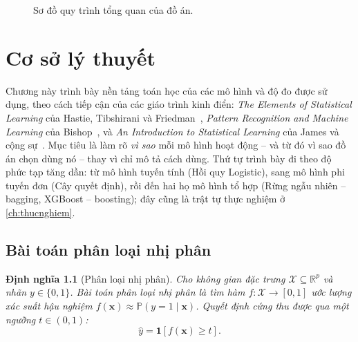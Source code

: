 \documentclass[12pt,a4paper,oneside]{report}
\theoremstyle{vnplain}
\theoremstyle{vndef}
\newtheorem{dinhnghia}[dlytheo]{Định nghĩa}
\newcommand{\R}{\mathbb{R}}
\newcommand{\Prob}{\mathbb{P}}
\newcommand{\xv}{\mathbf{x}}
\begin{document}
\begin{figure}[H]\centering
{}
\caption{Sơ đồ quy trình tổng quan của đồ án.}
\label{fig:pipeline}
\end{figure}

\chapter{Cơ sở lý thuyết}\label{ch:lythuyet}

Chương này trình bày nền tảng toán học của các mô hình và độ đo được sử dụng, theo cách
tiếp cận của các giáo trình kinh điển: \emph{The Elements of Statistical Learning} của
Hastie, Tibshirani và Friedman~\cite{hastie2009}, \emph{Pattern Recognition and Machine
Learning} của Bishop~\cite{bishop2006}, và \emph{An Introduction to Statistical Learning}
của James và cộng sự~\cite{james2021}. Mục tiêu là làm rõ \emph{vì sao} mỗi mô hình hoạt
động -- và từ đó vì sao đồ án chọn dùng nó -- thay vì chỉ mô tả cách dùng. Thứ tự trình bày
đi theo độ phức tạp tăng dần: từ mô hình tuyến tính (Hồi quy Logistic), sang mô hình phi
tuyến đơn (Cây quyết định), rồi đến hai họ mô hình tổ hợp (Rừng ngẫu nhiên -- bagging,
XGBoost -- boosting); đây cũng là trật tự thực nghiệm ở \cref{ch:thucnghiem}.

\section{Bài toán phân loại nhị phân}
\begin{khungtheo}
\begin{dinhnghia}[Phân loại nhị phân]
Cho không gian đặc trưng $\mathcal{X}\subseteq\R^p$ và nhãn $y\in\{0,1\}$. Bài toán phân
loại nhị phân là tìm hàm $f:\mathcal{X}\to[0,1]$ ước lượng xác suất hậu nghiệm
$f(\xv)\approx \Prob(y=1\mid \xv)$. Quyết định cứng thu được qua một ngưỡng $t\in(0,1)$:
\[
  \hat{y}=\mathbf{1}\!\left[f(\xv)\ge t\right].
\]
\end{dinhnghia}
\end{khungtheo}
\end{document}
